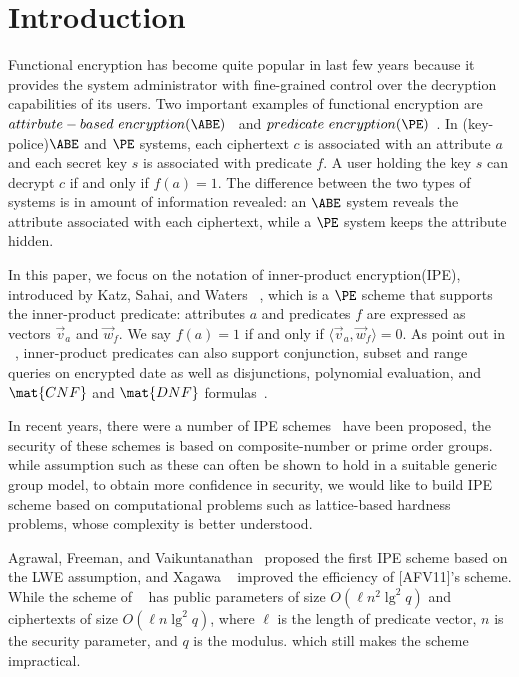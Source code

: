 \section{Introduction}
Functional encryption has become quite popular in last few years because it provides the system administrator with fine-grained control over the decryption capabilities of its users. Two important examples of functional encryption are $attirbute-based\ encryption(\ABE)$~\cite{EC:SahWat05, CCS:GPSW06} and $predicate\ encryption(\PE)\\ $~\cite{TCC:BonWat07,
EC:KatSahWat08}. In (key-police)$\ABE$ and $\PE$ systems, each ciphertext $c$ is associated with an attribute $a$ and each secret key $s$ is associated with predicate $f$. A user holding the key $s$ can decrypt $c$ if and only if $f(a)=1$. The difference between the two types of systems is in amount of information revealed: an $\ABE$ system reveals the attribute associated with each ciphertext, while a $\PE$ system keeps the attribute hidden.\

In this paper, we focus on the notation of inner-product encryption(IPE), introduced by Katz, Sahai, and Waters ~\cite{EC:KatSahWat08}, which is a $\PE$ scheme that supports the inner-product predicate: attributes $a$ and predicates $f$ are expressed as vectors $\overrightarrow{v}_{a}$ and $\overrightarrow{w}_{f}$. We say $f(a)=1$ if and only if $\langle \overrightarrow{v}_{a}, \overrightarrow{w}_{f} \rangle=0$. As point out in  ~\cite{EC:KatSahWat08}, inner-product predicates can also support conjunction, subset and range queries on encrypted date\cite{TCC:BonWat07} as well as disjunctions, polynomial evaluation, and $\mat{CNF}$ and $\mat{DNF}$ formulas~\cite{EC:KatSahWat08}.\

In recent years, there were a number of IPE schemes~\cite{EC:KatSahWat08, AC:OkaTak09, EC:LOSTW10, C:OkaTak10, PKC:AttLib10, Park2011Inner, CANS:OkaTak11, EC:OkaTak12} have been proposed, the security of these schemes is based on composite-number or prime order groups. while assumption such as these can often be shown to hold in a suitable generic group model, to obtain more confidence in security, we would like to build IPE scheme based on computational problems such as lattice-based hardness problems, whose complexity is better understood.\

Agrawal, Freeman, and Vaikuntanathan~ \cite{AC:AgrFreVai11} proposed the first IPE scheme based on the LWE assumption, and Xagawa ~\cite{PKC:Xagawa13} improved the efficiency of [AFV11]'s scheme. While the scheme of ~\cite{PKC:Xagawa13} has public parameters of size $O(\ell n^{2}\lg^{2}q)$ and ciphertexts of size $O(\ell n\lg^{2}q)$, where $\ell$ is the length of predicate vector, $n$ is the security parameter, and $q$ is the modulus. which still makes the scheme impractical.

